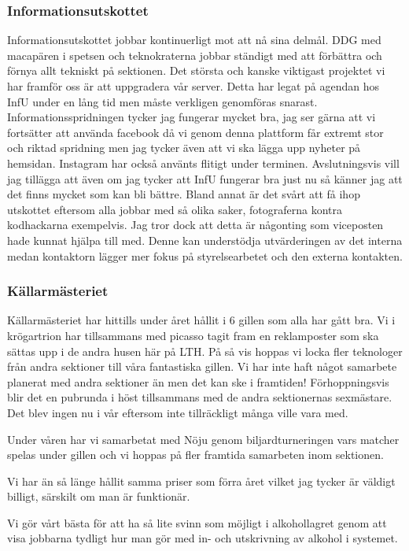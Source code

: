 \documentclass[../_main/handlingar.tex]{subfiles}
\begin{document}
\subsubsection*{Informationsutskottet}
Informationsutskottet jobbar kontinuerligt mot att nå sina delmål. DDG med macapären i spetsen och teknokraterna jobbar ständigt med att förbättra och förnya allt tekniskt på sektionen. Det största och kanske viktigast projektet vi har framför oss är att uppgradera vår server. Detta har legat på agendan hos InfU under en lång tid men måste verkligen genomföras snarast. Informationsspridningen tycker jag fungerar mycket bra, jag ser gärna att vi fortsätter att använda facebook då vi genom denna plattform får extremt stor och riktad spridning men jag tycker även att vi ska lägga upp nyheter på hemsidan. Instagram har också använts flitigt under terminen. Avslutningsvis vill jag tillägga att även om jag tycker att InfU fungerar bra just nu så känner jag att det finns mycket som kan bli bättre. Bland annat är det svårt att få ihop utskottet eftersom alla jobbar med så olika saker, fotograferna kontra kodhackarna exempelvis. Jag tror dock att detta är någonting som viceposten hade kunnat hjälpa till med. Denne kan understödja utvärderingen av det interna medan kontaktorn lägger mer fokus på styrelsearbetet och den externa kontakten. 

\subsubsection*{Källarmästeriet}
Källarmästeriet har hittills under året hållit i 6 gillen som alla har gått bra. Vi i krögartrion har tillsammans med picasso tagit fram en reklamposter som ska sättas upp i de andra husen här på LTH. På så vis hoppas vi locka fler teknologer från andra sektioner till våra fantastiska gillen.
Vi har inte haft något samarbete planerat med andra sektioner än men det kan ske i framtiden! Förhoppningsvis blir det en pubrunda i höst tillsammans med de andra sektionernas sexmästare. Det blev ingen nu i vår eftersom inte tillräckligt många ville vara med. 

Under våren har vi samarbetat med Nöju genom biljardturneringen vars matcher spelas under gillen och vi hoppas på fler framtida samarbeten inom sektionen.
 
Vi har än så länge hållit samma priser som förra året vilket jag tycker är väldigt billigt, särskilt om man är funktionär.
 
Vi gör vårt bästa för att ha så lite svinn som möjligt i alkohollagret genom att visa jobbarna tydligt hur man gör med in- och utskrivning av alkohol i systemet.
\end{document}
